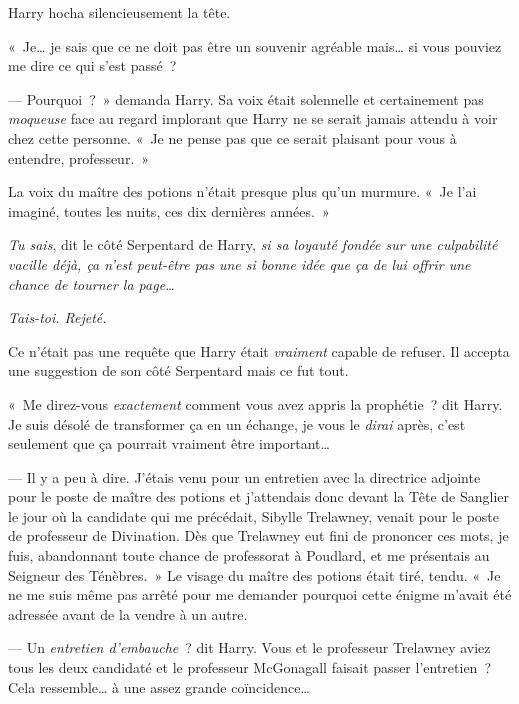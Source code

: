 Harry hocha silencieusement la tête.

«~Je… je sais que ce ne doit pas être un souvenir agréable mais… si vous pouviez me dire ce qui s'est passé~?

--- Pourquoi~?~» demanda Harry. Sa voix était solennelle et certainement pas \emph{moqueuse} face au regard implorant que Harry ne se serait jamais attendu à voir chez cette personne. «~Je ne pense pas que ce serait plaisant pour vous à entendre, professeur.~»

La voix du maître des potions n'était presque plus qu'un murmure. «~Je l'ai imaginé, toutes les nuits, ces dix dernières années.~»

\emph{Tu sais}, dit le côté Serpentard de Harry, \emph{si sa loyauté fondée sur une culpabilité vacille déjà, ça n'est peut-être pas une si bonne idée que ça de lui offrir une chance de tourner la page…}

\emph{Tais-toi. Rejeté.}

Ce n'était pas une requête que Harry était \emph{vraiment} capable de refuser. Il accepta une suggestion de son côté Serpentard mais ce fut tout.

«~Me direz-vous \emph{exactement} comment vous avez appris la prophétie~? dit Harry. Je suis désolé de transformer ça en un échange, je vous le \emph{dirai} après, c'est seulement que ça pourrait vraiment être important…

--- Il y a peu à dire. J'étais venu pour un entretien avec la directrice adjointe pour le poste de maître des potions et j'attendais donc devant la Tête de Sanglier le jour où la candidate qui me précédait, Sibylle Trelawney, venait pour le poste de professeur de Divination. Dès que Trelawney eut fini de prononcer ces mots, je fuis, abandonnant toute chance de professorat à Poudlard, et me présentais au Seigneur des Ténèbres.~» Le visage du maître des potions était tiré, tendu. «~Je ne me suis même pas arrêté pour me demander pourquoi cette énigme m'avait été adressée avant de la vendre à un autre.

--- Un \emph{entretien d'embauche}~? dit Harry. Vous et le professeur Trelawney aviez tous les deux candidaté et le professeur McGonagall faisait passer l'entretien~? Cela ressemble… à une assez grande coïncidence…


